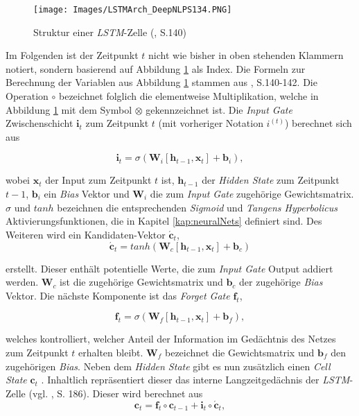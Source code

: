 \documentclass[a4paper,11pt]{article}
\begin{document}
\begin{figure}[!ht]
\begin{center}
\texttt{[image: Images/LSTMArch\_DeepNLPS134.PNG]}
\caption{Struktur einer \textit{LSTM}-Zelle (\cite{deepNLP}, S.140)}
\label{abb:LSTMArch}
\end{center}
\end{figure}

Im Folgenden ist der Zeitpunkt $t$ nicht wie bisher in oben stehenden Klammern notiert, sondern basierend auf Abbildung \ref{abb:LSTMArch} als Index. Die Formeln zur Berechnung der Variablen aus Abbildung \ref{abb:LSTMArch} stammen aus \cite{deepNLP}, S.140-142.
Die Operation $\circ$ bezeichnet folglich die elementweise Multiplikation, welche in Abbildung \ref{abb:LSTMArch} mit dem Symbol $\otimes$ gekennzeichnet ist.
Die \textit{Input Gate} Zwischenschicht $\bm{i}_t$ zum Zeitpunkt $t$ (mit vorheriger Notation $i^{(t)}$)  berechnet sich aus

\[ \bm{i}_t = \sigma(\bm{W}_i [\bm{h}_{t-1}, \bm{x}_t] + \bm{b}_i),\]

wobei $\bm{x}_t$ der Input zum Zeitpunkt $t$ ist, $\bm{h}_{t-1}$ der \textit{Hidden State} zum Zeitpunkt $t-1$, $\bm{b}_i$ ein \textit{Bias} Vektor und $\bm{W}_i$ die zum \textit{Input Gate} zugehörige Gewichtsmatrix. $\sigma$ und $tanh$ bezeichnen die entsprechenden \textit{Sigmoid} und \textit{Tangens Hyperbolicus} Aktivierungsfunktionen, die in Kapitel \ref{kap:neuralNets} definiert sind. Des Weiteren wird ein Kandidaten-Vektor $\bm{\acute{c}}_t$, 
\[\bm{\acute{c}}_t = tanh(\bm{W}_c [\bm{h}_{t-1}, \bm{x}_t] + \bm{b}_c)\]

erstellt. Dieser enthält potentielle Werte, die zum \textit{Input Gate} Output addiert werden. $\bm{W}_c$ ist die zugehörige Gewichtsmatrix und $\bm{b}_c$ der zugehörige \textit{Bias} Vektor. Die nächste Komponente ist das \textit{Forget Gate} $\bm{f}_t$,

\[  \bm{f}_t = \sigma(\bm{W}_f [\bm{h}_{t-1}, \bm{x}_t] + \bm{b}_f) ,\]

welches kontrolliert, welcher Anteil der Information im Gedächtnis des Netzes zum Zeitpunkt $t$ erhalten bleibt. $\bm{W}_f$ bezeichnet die Gewichtsmatrix und $\bm{b}_f$ den zugehörigen \textit{Bias}. Neben dem \textit{Hidden State} gibt es nun zusätzlich einen \textit{Cell State} $\bm{c}_t$ . Inhaltlich repräsentiert dieser das interne Langzeitgedächnis der \textit{LSTM}-Zelle (vgl. \cite{keras}, S. 186). Dieser wird berechnet aus
\[\bm{c}_t = \bm{f}_t \circ \bm{c}_{t-1} + \bm{i}_t \circ \bm{\acute{c}}_t ,\]
\end{document}
